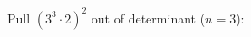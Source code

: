 \documentclass[preview]{standalone}
\begin{document}
\begin{center}
Pull $(3^3 \cdot 2)^2$ out of determinant ($n=3$):
\end{center}
\end{document}
